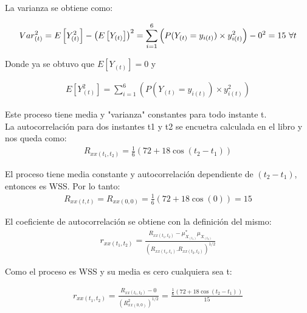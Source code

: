 La varianza se obtiene como:

\begin{equation*}
\begin{gathered}
	Var^{2}_{(t)} = E\left[Y_{(t)}^{2}\right]- \left(E\left[Y_{(t)}\right]\right)^{2}  = \sum_{i=1}^{6}\left( P(Y_{(t)} = y_{i(t)}) \times y_{i(t)}^{2}\right) - 0^2 = 15 $   $ \forall t 
\end{gathered}
\end{equation*}

Donde ya se obtuvo que $E\left[Y_{(t)}\right] = 0$ y 

\begin{equation*}
\begin{gathered}
	E\left[Y_{(t)}^{2}\right] = \sum_{i=1}^{6}\left( P(Y_{(t)} = y_{i(t)}) \times y_{i(t)}^{2}\right) 
\end{gathered}
\end{equation*}

Este proceso tiene media y "varianza" constantes para todo instante t.\\

La autocorrelación para dos instantes t1 y t2 se encuetra calculada en el libro y nos queda como:
\begin{equation*}
\begin{gathered}
	R_{xx(t_1,t_2)} = \frac{1}{6}\left(72+ 18 \cos(t_2 - t_1)\right)
\end{gathered}
\end{equation*}

El proceso tiene media constante y autocorrelación dependiente de $(t_2 - t_1)$, entonces es WSS. Por lo tanto:
\begin{equation*}
\begin{gathered}
	R_{xx(t,t)} = R_{xx(0,0)} = \frac{1}{6}\left(72+ 18 \cos(0)\right) = 15
\end{gathered}
\end{equation*}

El coeficiente de autocorrelación se obtiene con la definición del mismo:
\begin{equation*}
\begin{gathered}
	r_{xx(t_1,t_2)} = \frac{R_{xx(t_1,t_2)}-\mu_{X_{(t_1)}}^{*} \mu_{X_{(t_2)}}}{\left(R_{xx(t_1,t_1)}.R_{xx(t_2,t_2)}\right)^{1/2}} 
\end{gathered}
\end{equation*}

Como el proceso es WSS y su media es cero cualquiera sea t:

\begin{equation*}
\begin{gathered}
	r_{xx(t_1,t_2)} = \frac{R_{xx(t_1,t_2)}-0}{(R_{xx(0,0)}^2)^{1/2}} = \frac{\frac{1}{6}\left(72+ 18 \cos(t_2 - t_1)\right)}{15}
\end{gathered}
\end{equation*}


